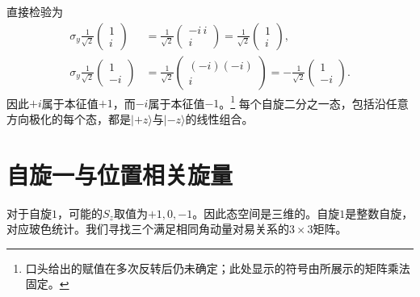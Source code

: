\begin{classroomqa}
\end{classroomqa}

直接检验为
\begin{align}
\sigma_y\frac{1}{\sqrt2}
\begin{pmatrix}
1\\
i
\end{pmatrix}
&=
\frac{1}{\sqrt2}
\begin{pmatrix}
-i\,i\\
i
\end{pmatrix}
=
\frac{1}{\sqrt2}
\begin{pmatrix}
1\\
i
\end{pmatrix},\\
\sigma_y\frac{1}{\sqrt2}
\begin{pmatrix}
1\\
-i
\end{pmatrix}
&=
\frac{1}{\sqrt2}
\begin{pmatrix}
(-i)(-i)\\
i
\end{pmatrix}
=
-\frac{1}{\sqrt2}
\begin{pmatrix}
1\\
-i
\end{pmatrix}.
\end{align}
因此\(+i\)属于本征值\(+1\)，而\(-i\)属于本征值\(-1\)。\footnote{口头给出的赋值在多次反转后仍未确定；此处显示的符号由所展示的矩阵乘法固定。} 每个自旋二分之一态，包括沿任意方向极化的每个态，都是\(|+z\rangle\)与\(|-z\rangle\)的线性组合。

\section{自旋一与位置相关旋量}

对于自旋\(1\)，可能的\(S_z\)取值为\(+1,0,-1\)。因此态空间是三维的。自旋\(1\)是整数自旋，对应玻色统计。我们寻找三个满足相同角动量对易关系的\(3\times3\)矩阵。

